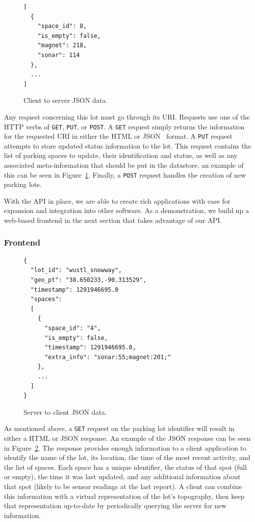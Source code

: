 \documentclass{acm_proc}
\begin{document}
\begin{figure}
    \begin{verbatim}
[
  {
    "space_id": 8,
    "is_empty": false,
    "magnet": 218,
    "sonar": 114
  },
  ...
]
\end{verbatim}
	\caption{Client to server JSON data.}
	\label{fig:clientserverjson}
\end{figure}

Any request concerning this lot must go through its URI.
Requests use one of the HTTP verbs of \texttt{GET}, \texttt{PUT}, or
\texttt{POST}.
A \texttt{GET} request simply returns the information for the requested URI
in either the HTML or JSON~\cite{crockford:json} format.
A \texttt{PUT} request attempts to store updated status information to the
lot.
This request contains the list of parking spaces to update, their
identification and status, as well as any associated meta-information that
should be put in the datastore, an example of this can be seen in
Figure~\ref{fig:clientserverjson}.
Finally, a \texttt{POST} request handles the creation of new parking lots.

With the API in place, we are able to create rich applications with ease
for expansion and integration into other software.
As a demonstration, we build up a web-based frontend in the next section
that takes advantage of our API.

\subsubsection{Frontend}

\begin{figure}
    \begin{verbatim}
{
  "lot_id": "wustl_snowway",
  "geo_pt": "38.650233,-90.313529",
  "timestamp": 1291946695.0
  "spaces":
  [
    {
      "space_id": "4",
      "is_empty": false,
      "timestamp": 1291946695.0,
      "extra_info": "sonar:55;magnet:201;"
    },
    ...
  ]
}
\end{verbatim}
	\caption{Server to client JSON data.}
	\label{fig:serverclientjson}
\end{figure}

As mentioned above, a \texttt{GET} request on the parking lot identifier
will result in either a HTML or JSON response.
An example of the JSON response can be seen in
Figure~\ref{fig:serverclientjson}.
The response provides enough information to a client application to
identify the name of the lot, its location, the time of the most recent
activity, and the list of spaces.
Each space has a unique identifier, the status of that spot (full or
empty), the time it was last updated, and any additional information about
that spot (likely to be sensor readings at the last report).
A client can combine this information with a virtual representation of the
lot's topography, then keep that representation up-to-date by periodically
querying the server for new information.
\end{document}
